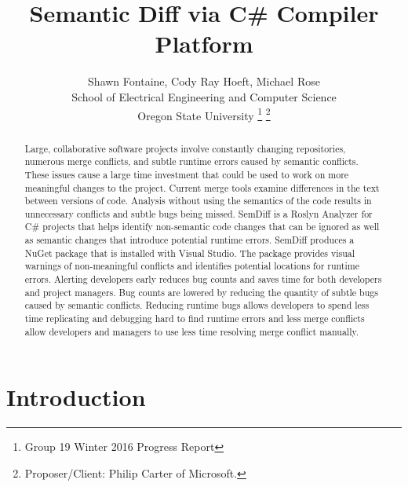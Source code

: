 \documentclass[draftclsnofoot,onecolumn]{IEEEtran}
\begin{document}
\lstset{style=cSharp}
\title{Semantic Diff via C\# Compiler Platform}

\author{Shawn Fontaine, Cody Ray Hoeft, Michael Rose\\
	School of Electrical Engineering and Computer Science\\
	Oregon State University
\thanks{Group 19 Winter 2016 Progress Report}
\thanks{Proposer/Client: Philip Carter of Microsoft.}}

\maketitle
{} %

\begin{abstract}
Large, collaborative software projects involve constantly changing repositories, 
numerous merge conflicts, and subtle runtime errors caused by semantic 
conflicts. These issues cause a large time investment that could be used to 
work on more meaningful changes to the project. Current merge tools examine 
differences in the text between versions of code. Analysis without using the 
semantics of the code results in unnecessary conflicts and subtle bugs being 
missed. SemDiff is a Roslyn Analyzer for C\# projects that helps identify 
non-semantic code changes that can be ignored as well as semantic changes that 
introduce potential runtime errors. SemDiff produces a NuGet package that is 
installed with Visual Studio. The package provides visual warnings of 
non-meaningful conflicts and identifies potential locations for runtime errors. 
Alerting developers early reduces bug counts and saves time for both developers 
and project managers. Bug counts are lowered by reducing the quantity of subtle 
bugs caused by semantic conflicts. Reducing runtime bugs allows developers to 
spend less time replicating and debugging hard to find runtime errors and less 
merge conflicts allow developers and managers to use less time resolving merge 
conflict manually. 
\end{abstract}

\newpage
\setcounter{tocdepth}{2}
\tableofcontents


\newpage
{}

\section{Introduction}%
\end{document}

